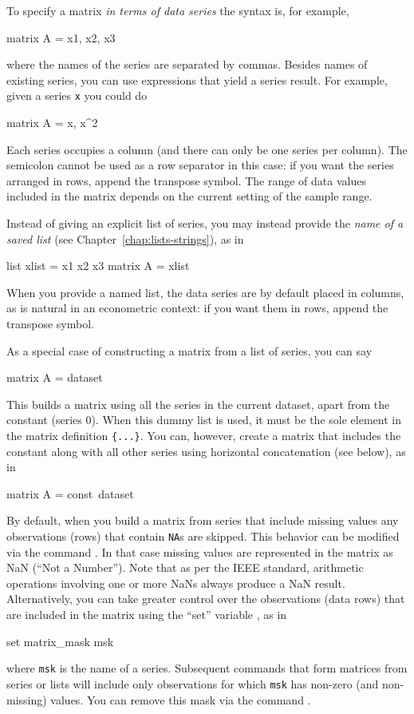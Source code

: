 To specify a matrix \textit{in terms of data series} the syntax is,
for example,
%
\begin{code}
matrix A = {x1, x2, x3}
\end{code}
%
where the names of the series are separated by commas.  Besides names
of existing series, you can use expressions that yield a series
result.  For example, given a series \texttt{x} you could do
%
\begin{code}
matrix A = {x, x^2}
\end{code}
%
Each series occupies a column (and there can only be one series per
column).  The semicolon cannot be used as a row separator in this
case: if you want the series arranged in rows, append the transpose
symbol.  The range of data values included in the matrix depends on
the current setting of the sample range.

Instead of giving an explicit list of series, you may instead provide
the \textit{name of a saved list} (see
Chapter~\ref{chap:lists-strings}), as in
%
\begin{code}
list xlist = x1 x2 x3
matrix A = {xlist}
\end{code}
%
When you provide a named list, the data series are by default placed
in columns, as is natural in an econometric context: if you want them
in rows, append the transpose symbol.

As a special case of constructing a matrix from a list of series,
you can say
%
\begin{code}
matrix A = {dataset}
\end{code}
%
This builds a matrix using all the series in the current dataset,
apart from the constant (series 0).  When this dummy list is used, it
must be the sole element in the matrix definition \texttt{\{...\}}.  You
can, however, create a matrix that includes the constant along with
all other series using horizontal concatenation (see below), as in
%
\begin{code}
matrix A = {const}~{dataset}
\end{code}
%

By default, when you build a matrix from series that include missing
values any observations (rows) that contain \texttt{NA}s are skipped.
This behavior can be modified via the command .  In that case missing values are represented in the matrix as
NaN (``Not a Number'').  Note that as per the IEEE standard,
arithmetic operations involving one or more NaNs always produce a NaN
result. Alternatively, you can take greater control over the
observations (data rows) that are included in the matrix using the
``set'' variable , as in
%
\begin{code}
set matrix_mask msk
\end{code}
%
where \texttt{msk} is the name of a series.  Subsequent commands that
form matrices from series or lists will include only observations
for which \texttt{msk} has non-zero (and non-missing) values. You
can remove this mask via the command .

